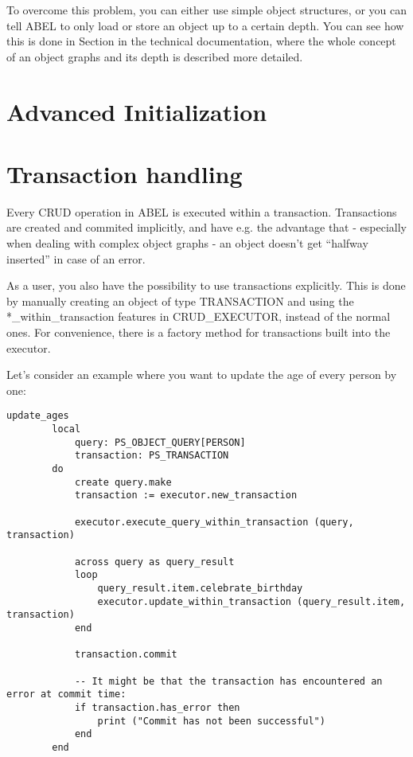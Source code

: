 To overcome this problem, you can either use simple object structures, or you can tell ABEL to only load or store an object up to a certain depth.
You can see how this is done in Section  in the technical documentation, where the whole concept of an object graphs and its depth is described more detailed.



\section{Advanced Initialization}
\label{section:advanced_initialization}


\section{Transaction handling}

Every CRUD operation in ABEL is executed within a transaction. 
Transactions are created and commited implicitly, and have e.g. the advantage that - especially when dealing with complex object graphs - an object doesn't get ``halfway inserted'' in case of an error.

As a user, you also have the possibility to use transactions explicitly. 
This is done by manually creating an object of type TRANSACTION and using the *\_within\_transaction features in CRUD\_EXECUTOR, instead of the normal ones.
For convenience, there is a factory method for transactions built into the executor.

Let's consider an example where you want to update the age of every person by one:

\begin{lstlisting}[language=OOSC2Eiffel, captionpos=b, caption={}, label={lst:update_all_ages}]
	update_ages
		local
			query: PS_OBJECT_QUERY[PERSON]
			transaction: PS_TRANSACTION
		do
			create query.make
			transaction := executor.new_transaction

			executor.execute_query_within_transaction (query, transaction)

			across query as query_result
			loop
				query_result.item.celebrate_birthday
				executor.update_within_transaction (query_result.item, transaction)
			end

			transaction.commit

			-- It might be that the transaction has encountered an error at commit time:
			if transaction.has_error then
				print ("Commit has not been successful")
			end
		end
\end{lstlisting}

